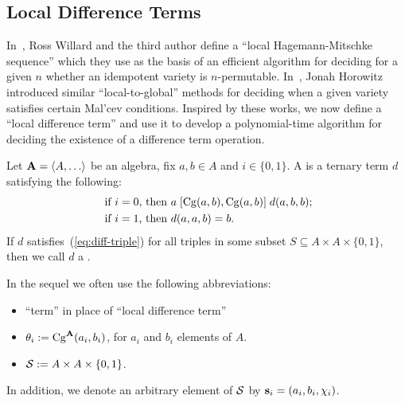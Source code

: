 \subsection{Local Difference Terms}
\label{sec:local-diff-terms}
In~\cite{MR3239624},
Ross Willard and the third author define %
a ``local Hagemann-Mitschke sequence'' which they use as the basis of
an efficient algorithm for deciding for a given $n$ whether an idempotent
variety is $n$-permutable.
In~\cite{MR3109457}, Jonah Horowitz introduced similar 
``local-to-global'' methods for deciding when a given variety satisfies 
certain Mal'cev conditions.
Inspired by these works, we now define a ``local difference term'' and 
use it to develop a polynomial-time algorithm for deciding the existence 
of a difference term operation.

Let $\bA=\< A, \dots\>$ be an algebra, fix $a, b \in A$ and
$i \in \{0,1\}$.
A  
is a ternary term $d$ satisfying the following:
\begin{align}
\text{ if $i=0$, then } & a \mathrel{[\operatorname{Cg}(a,b), \operatorname{Cg}(a,b)]} d(a,b,b); \label{eq:diff-triple}\\
\text{ if $i=1$, then } &d(a,a,b) = b. \nonumber
\end{align}
If $d$ satisfies~(\ref{eq:diff-triple}) for all triples
in some subset $S\subseteq A \times A \times \{0,1\}$, then we call $d$
a .

\smallskip

 In the sequel we often use the following 
abbreviations:
\begin{itemize}
\item 
``\ld term'' in place of ``local difference term''
\item $\theta_i:= \operatorname{Cg}^{\mathbf{A}}(a_i, b_i)$,
for $a_i$ and $b_i$ elements of $A$.
\item $\mathcal{S} := A \times A \times \{0,1\}$. 
\end{itemize}
In addition, we denote an 
arbitrary element of $\mathcal{S}$ by $\mathbf{s}_i = (a_i, b_i, \chi_i)$.

